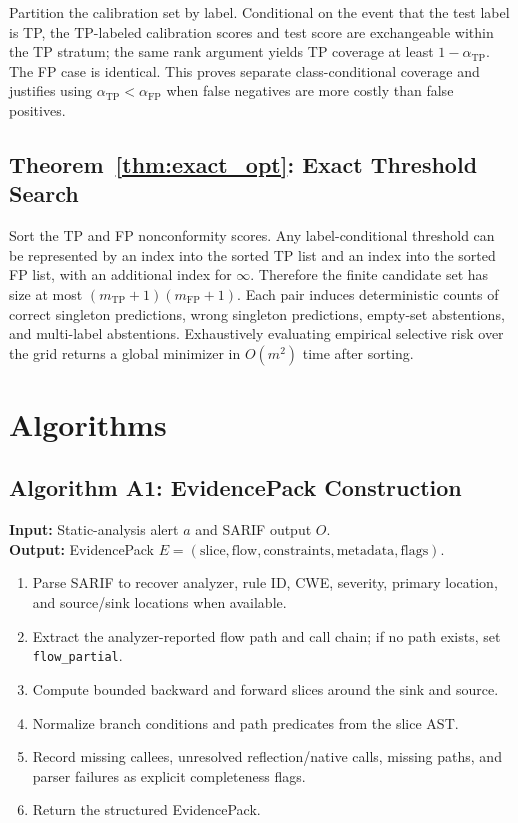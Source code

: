 Partition the calibration set by label. Conditional on the event that the test label is TP, the TP-labeled calibration scores and test score are exchangeable within the TP stratum; the same rank argument yields TP coverage at least $1-\alpha_{\mathrm{TP}}$. The FP case is identical. This proves separate class-conditional coverage and justifies using $\alpha_{\mathrm{TP}}<\alpha_{\mathrm{FP}}$ when false negatives are more costly than false positives.

\subsection{Theorem~\ref{thm:exact_opt}: Exact Threshold Search}

Sort the TP and FP nonconformity scores. Any label-conditional threshold can be represented by an index into the sorted TP list and an index into the sorted FP list, with an additional index for $\infty$. Therefore the finite candidate set has size at most $(m_{\mathrm{TP}}+1)(m_{\mathrm{FP}}+1)$. Each pair induces deterministic counts of correct singleton predictions, wrong singleton predictions, empty-set abstentions, and multi-label abstentions. Exhaustively evaluating empirical selective risk over the grid returns a global minimizer in $O(m^2)$ time after sorting.

\section{Algorithms}
\label{app:algorithm_details}

\subsection{Algorithm A1: EvidencePack Construction}

\begin{algorithm}[h]
\label{alg:evidence}
\textbf{Input:} Static-analysis alert $a$ and SARIF output $O$.\\
\textbf{Output:} EvidencePack $E=(\text{slice},\text{flow},\text{constraints},\text{metadata},\text{flags})$.
\begin{enumerate}
\item Parse SARIF to recover analyzer, rule ID, CWE, severity, primary location, and source/sink locations when available.
\item Extract the analyzer-reported flow path and call chain; if no path exists, set \texttt{flow\_partial}.
\item Compute bounded backward and forward slices around the sink and source.
\item Normalize branch conditions and path predicates from the slice AST.
\item Record missing callees, unresolved reflection/native calls, missing paths, and parser failures as explicit completeness flags.
\item Return the structured EvidencePack.
\end{enumerate}
\end{algorithm}

